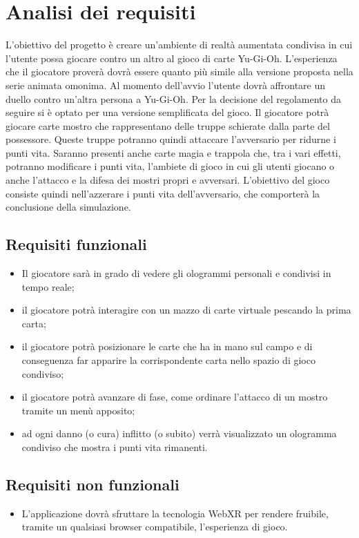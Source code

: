 \section{Analisi dei requisiti}\label{sec:Analisi}
    L’obiettivo del progetto è creare un’ambiente di realtà aumentata condivisa
    in cui l’utente possa giocare contro un altro al gioco di carte Yu-Gi-Oh. L’esperienza che il giocatore proverà dovrà essere quanto più simile alla versione
    proposta nella serie animata omonima.
    \newline \newline
    Al momento dell’avvio l’utente dovrà affrontare un duello contro un’altra persona a Yu-Gi-Oh. Per la decisione del regolamento da seguire si è optato per
    una versione semplificata del gioco. Il giocatore potrà giocare carte mostro che
    rappresentano delle truppe schierate dalla parte del possessore. Queste truppe
    potranno quindi attaccare l’avversario per ridurne i punti vita. Saranno presenti anche carte magia e trappola che, tra i vari effetti, potranno modificare
    i punti vita, l’ambiete di gioco in cui gli utenti giocano o anche l’attacco e
    la difesa dei mostri propri e avversari. L’obiettivo del gioco consiste quindi
    nell’azzerare i punti vita dell’avversario, che comporterà la conclusione della
    simulazione.

    \subsection{Requisiti funzionali}\label{subsec:requisitiFunzionali}
        \begin{itemize}
            \item Il giocatore sarà in grado di vedere gli ologrammi personali e condivisi in tempo reale;
            \item il giocatore potrà interagire con un mazzo di carte virtuale pescando la prima carta;
            \item il giocatore potrà posizionare le carte che ha in mano sul campo e di
            conseguenza far apparire la corrispondente carta nello spazio di gioco
            condiviso;
            \item il giocatore potrà avanzare di fase, come ordinare l'attacco di un mostro tramite un menù apposito;
            \item ad ogni danno (o cura) inflitto (o subito) verrà visualizzato un ologramma condiviso che mostra i punti vita rimanenti.
        \end{itemize}
    \subsection{Requisiti non funzionali}\label{subsec:requisitiNonFunzionali}
        \begin{itemize}
            \item L'applicazione dovrà sfruttare la tecnologia WebXR per rendere fruibile, tramite un qualsiasi browser compatibile, l'esperienza di gioco.
        \end{itemize}